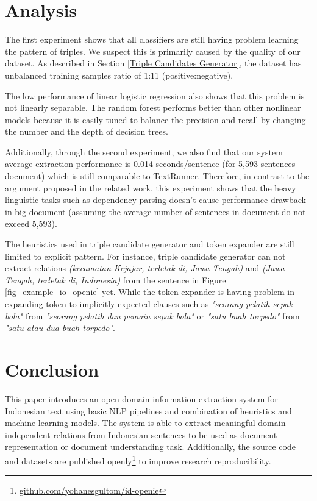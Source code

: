 \documentclass[peerreview,12pt]{IEEEtran}
\begin{document}
\section{Analysis}

The first experiment shows that all classifiers are still having problem learning the pattern of triples. We suspect this is primarily caused by the quality of our dataset. As described in Section \ref{Triple Candidates Generator}, the dataset has unbalanced training samples ratio of 1:11 (positive:negative). 

The low performance of linear logistic regression also shows that this problem is not linearly separable. The random forest performs better than other nonlinear models because it is easily tuned to balance the precision and recall by changing the number and the depth of decision trees.

Additionally, through the second experiment, we also find that our system average extraction performance is 0.014 seconds/sentence (for 5,593 sentences document) which is still comparable to TextRunner\cite{banko2007open}. Therefore, in contrast to the argument proposed in the related work\cite{banko2007open}\cite{etzioni2011open}, this experiment shows that the heavy linguistic tasks such as dependency parsing doesn't cause performance drawback in big document (assuming the average number of sentences in document do not exceed 5,593). 

The heuristics used in triple candidate generator and token expander are still limited to explicit pattern. For instance, triple candidate generator can not extract relations \textit{(kecamatan Kejajar, terletak di, Jawa Tengah)} and \textit{(Jawa Tengah, terletak di, Indonesia)} from the sentence in Figure \ref{fig_example_io_openie} yet. While the token expander is having problem in expanding token to implicitly expected clauses such as \textit{"seorang pelatih sepak bola"} from \textit{"seorang pelatih dan pemain sepak bola"} or \textit{"satu buah torpedo"} from \textit{"satu atau dua buah torpedo"}.

\section{Conclusion}

This paper introduces an open domain information extraction system for Indonesian text using basic NLP pipelines and combination of heuristics and machine learning models. The system is able to extract meaningful domain-independent relations from Indonesian sentences to be used as document representation or document understanding task. Additionally, the source code and datasets are published openly\footnote{\url{github.com/yohanesgultom/id-openie}} to improve research reproducibility.
\end{document}
